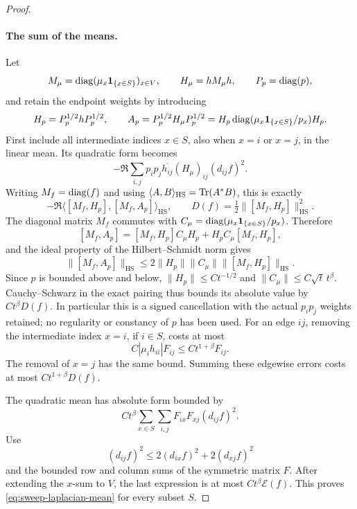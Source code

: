 \begin{proof}
\paragraph{The sum of the means.}
Let
\[
 M_\mu=\operatorname{diag}(\mu_x\mathbf1_{\{x\in S\}})_{x\in V},
 \qquad H_\mu=hM_\mu h,\qquad P_p=\operatorname{diag}(p),
\]
and retain the endpoint weights by introducing
\[
 H_p=P_p^{1/2}hP_p^{1/2},\qquad
 A_p=P_p^{1/2}H_\mu P_p^{1/2}
     =H_p\operatorname{diag}(\mu_x\mathbf1_{\{x\in S\}}/p_x)H_p.
\]
First include all intermediate indices \(x\in S\), also when \(x=i\)
or \(x=j\), in the linear mean.  Its quadratic form becomes
\[
 -\Re\sum_{i,j}p_ip_j\overline{h_{ij}}(H_\mu)_{ij}(d_{ij}f)^2.
\]
Writing $M_f=\operatorname{diag}(f)$ and using
$\langle A,B\rangle_{\mathrm{HS}}=\operatorname{Tr}(A^*B)$, this is exactly
\[
 -\Re\langle[M_f,H_p],[M_f,A_p]\rangle_{\mathrm{HS}},
 \qquad
 D(f)=\tfrac12\|[M_f,H_p]\|_{\mathrm{HS}}^2.
\]
The diagonal matrix $M_f$ commutes with
$C_\mu=\operatorname{diag}(\mu_x\mathbf1_{\{x\in S\}}/p_x)$. Therefore
\[
 [M_f,A_p]=[M_f,H_p]C_\mu H_p+H_pC_\mu[M_f,H_p],
\]
and the ideal property of the Hilbert--Schmidt norm gives
\[
 \|[M_f,A_p]\|_{\mathrm{HS}}
 \le2\|H_p\|\|C_\mu\|\|[M_f,H_p]\|_{\mathrm{HS}}.
\]
Since $p$ is bounded above and below,
$\|H_p\|\le Ct^{-1/2}$ and
$\|C_\mu\|\le C\sqrt t\,t^\beta$. Cauchy--Schwarz in the exact
pairing thus bounds its absolute value by $Ct^\beta D(f)$.
In particular this is a signed cancellation with the actual $p_i p_j$
weights retained; no regularity or constancy of $p$ has been used.
For an edge \(ij\), removing the intermediate index \(x=i\), if
\(i\in S\), costs at most
\[
 C|\mu_i h_{ii}|F_{ij}\le Ct^{1+\beta}F_{ij}.
\]
The removal of \(x=j\) has the same bound.  Summing these edgewise
errors costs at most \(Ct^{1+\beta}D(f)\).

The quadratic mean has absolute form bounded by
\[
 Ct^\beta\sum_{x\in S}\sum_{i,j}F_{ix}F_{xj}(d_{ij}f)^2.
\]
Use
\[
 (d_{ij}f)^2\le2(d_{ix}f)^2+2(d_{xj}f)^2
\]
and the bounded row and column sums of the symmetric matrix \(F\).
After extending the \(x\)-sum to \(V\), the last expression is at most
\(Ct^\beta\mathcal E(f)\).  This proves
\eqref{eq:sweep-laplacian-mean} for every subset \(S\).


\end{proof}
